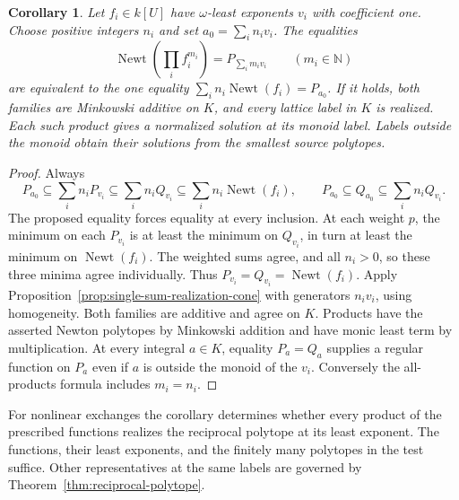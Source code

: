 \documentclass[11pt,reqno]{amsart}
\numberwithin{equation}{section}
\newtheorem{corollary}[theorem]{Corollary}
\theoremstyle{definition}
\theoremstyle{remark}
\DeclareMathOperator{\Newt}{Newt}
\begin{document}
\begin{corollary}\label{cor:one-product-realization-cone}
Let \(f_i\in k[U]\) have \(\omega\)-least exponents \(v_i\) with
coefficient one. Choose positive integers \(n_i\) and set
\(a_0=\sum_i n_i v_i\). The equalities
\[ \Newt\!\left(\prod_i f_i^{m_i}\right)=P_{\sum_i m_i v_i} \qquad(m_i\in\mathbb N) \]
are equivalent to the one equality
\(\sum_i n_i\Newt(f_i)=P_{a_0}\).
If it holds, both families are Minkowski additive on \(K\), and every
lattice label in \(K\) is realized. Each such product gives a
normalized solution at its monoid label. Labels outside the monoid
obtain their solutions from the smallest source polytopes.
\end{corollary}
\begin{proof}
Always
\[ P_{a_0}\subseteq\sum_i n_iP_{v_i} \subseteq\sum_i n_iQ_{v_i}\subseteq\sum_i n_i\Newt(f_i), \qquad P_{a_0}\subseteq Q_{a_0}\subseteq\sum_i n_iQ_{v_i}. \]
The proposed equality forces equality at every inclusion. At each
weight \(p\), the minimum on each \(P_{v_i}\) is at least the minimum
on \(Q_{v_i}\), in turn at least the minimum on \(\Newt(f_i)\).
The weighted sums agree, and all \(n_i>0\), so these three minima
agree individually. Thus \(P_{v_i}=Q_{v_i}=\Newt(f_i)\).
Apply Proposition~\ref{prop:single-sum-realization-cone} with generators
\(n_i v_i\), using homogeneity. Both families are additive and agree
on \(K\). Products have the asserted Newton polytopes by Minkowski
addition and have monic least term by multiplication. At every
integral \(a\in K\), equality \(P_a=Q_a\) supplies a regular function
on \(P_a\) even if \(a\) is outside the monoid of the \(v_i\). Conversely
the all-products formula includes \(m_i=n_i\).
\end{proof}

For nonlinear exchanges the corollary determines whether every product
of the prescribed functions realizes the reciprocal polytope at its least exponent. The
functions, their least exponents, and the finitely many polytopes
in the test suffice. Other representatives at the same labels are
governed by Theorem~\ref{thm:reciprocal-polytope}.
\end{document}
